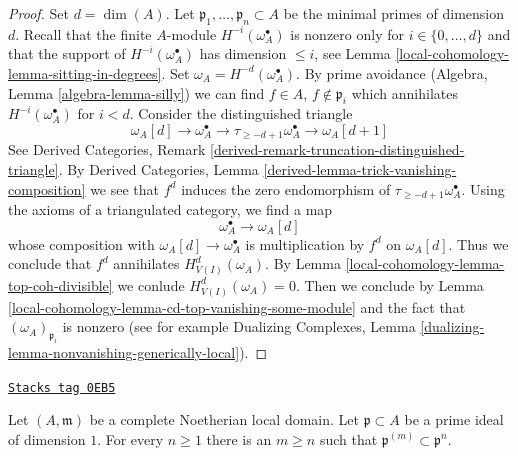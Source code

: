 \begin{proof}
Set $d = \dim(A)$. Let $\mathfrak p_1, \ldots, \mathfrak p_n \subset A$
be the minimal primes of dimension $d$.
Recall that the finite $A$-module
$H^{-i}(\omega_A^\bullet)$ is nonzero only for
$i \in \{0, \ldots, d\}$ and that the support
of $H^{-i}(\omega_A^\bullet)$ has dimension $\leq i$, see
Lemma \ref{local-cohomology-lemma-sitting-in-degrees}.
Set $\omega_A = H^{-d}(\omega_A^\bullet)$.
By prime avoidance (Algebra, Lemma \ref{algebra-lemma-silly})
we can find $f \in A$, $f \not \in \mathfrak p_i$
which annihilates $H^{-i}(\omega_A^\bullet)$ for $i < d$.
Consider the distinguished triangle
$$
\omega_A[d] \to \omega_A^\bullet \to
\tau_{\geq -d + 1}\omega_A^\bullet \to \omega_A[d + 1]
$$
See Derived Categories, Remark
\ref{derived-remark-truncation-distinguished-triangle}.
By Derived Categories, Lemma \ref{derived-lemma-trick-vanishing-composition}
we see that $f^d$ induces the zero endomorphism of
$\tau_{\geq -d + 1}\omega_A^\bullet$.
Using the axioms of a triangulated category, we find a map
$$
\omega_A^\bullet \to \omega_A[d]
$$
whose composition with $\omega_A[d] \to \omega_A^\bullet$ is
multiplication by $f^d$ on $\omega_A[d]$.
Thus we conclude that $f^d$ annihilates $H^d_{V(I)}(\omega_A)$.
By Lemma \ref{local-cohomology-lemma-top-coh-divisible} we conlude $H^d_{V(I)}(\omega_A) = 0$.
Then we conclude by Lemma \ref{local-cohomology-lemma-cd-top-vanishing-some-module}
and the fact that $(\omega_A)_{\mathfrak p_i}$ is nonzero
(see for example
Dualizing Complexes, Lemma
\ref{dualizing-lemma-nonvanishing-generically-local}).
\end{proof}

\begin{lemma}
\label{local-cohomology-lemma-inverse-system-symbolic-powers}
\href{https://stacks.math.columbia.edu/tag/0EB5}{\texttt{Stacks tag 0EB5}}

Let $(A, \mathfrak m)$ be a complete Noetherian local domain. Let
$\mathfrak p \subset A$ be a prime ideal of dimension $1$.
For every $n \geq 1$ there is an $m \geq n$ such that
$\mathfrak p^{(m)} \subset \mathfrak p^n$.
\end{lemma}

